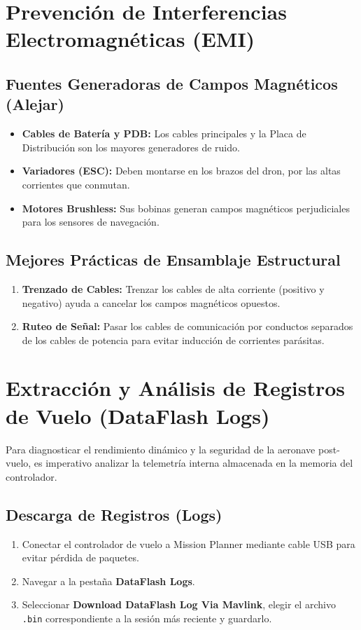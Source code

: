 \documentclass[12pt,a4paper]{article}
\begin{document}
\section{Prevención de Interferencias Electromagnéticas (EMI)}

\subsection{Fuentes Generadoras de Campos Magnéticos (Alejar)}
\begin{itemize}[leftmargin=*]
    \item \textbf{Cables de Batería y PDB:} Los cables principales y la Placa de Distribución son los mayores generadores de ruido.
    \item \textbf{Variadores (ESC):} Deben montarse en los brazos del dron, por las altas corrientes que conmutan.
    \item \textbf{Motores Brushless:} Sus bobinas generan campos magnéticos perjudiciales para los sensores de navegación.
\end{itemize}

\subsection{Mejores Prácticas de Ensamblaje Estructural}
\begin{enumerate}[leftmargin=*]
    \item \textbf{Trenzado de Cables:} Trenzar los cables de alta corriente (positivo y negativo) ayuda a cancelar los campos magnéticos opuestos.
    \item \textbf{Ruteo de Señal:} Pasar los cables de comunicación por conductos separados de los cables de potencia para evitar inducción de corrientes parásitas.
\end{enumerate}

\section{Extracción y Análisis de Registros de Vuelo (DataFlash Logs)}
Para diagnosticar el rendimiento dinámico y la seguridad de la aeronave post-vuelo, es imperativo analizar la telemetría interna almacenada en la memoria del controlador.

\subsection{Descarga de Registros (Logs)}
\begin{enumerate}[leftmargin=*]
    \item Conectar el controlador de vuelo a Mission Planner mediante cable USB para evitar pérdida de paquetes.
    \item Navegar a la pestaña \textbf{DataFlash Logs}.
    \item Seleccionar \textbf{Download DataFlash Log Via Mavlink}, elegir el archivo \texttt{.bin} correspondiente a la sesión más reciente y guardarlo.
\end{enumerate}
\end{document}
